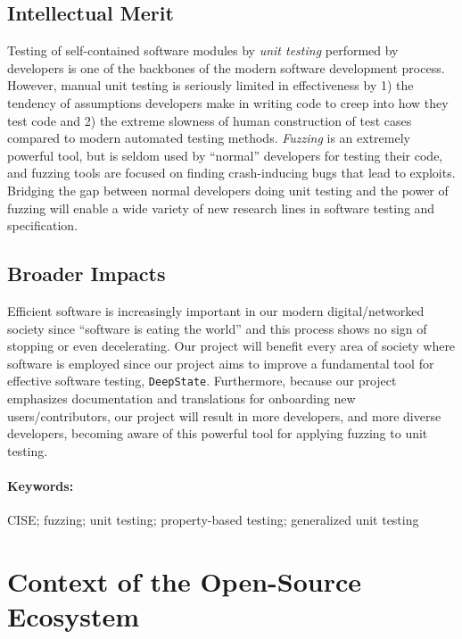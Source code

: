 \documentclass[numbers]{proposalnsf}
\newcommand{\ds}{\texttt{DeepState}}
\begin{document}
\subsection*{Intellectual Merit} 
\vspace{-2mm}
Testing of self-contained software modules by \emph{unit testing} performed by developers is one of the backbones of the modern software development process.  However, manual unit testing is seriously limited in effectiveness by 1) the tendency of assumptions developers make in writing code to creep into how they test code and 2) the extreme slowness of human construction of test cases compared to modern automated testing methods.  \emph{Fuzzing} is an extremely powerful tool, but is seldom used by ``normal'' developers for testing their code, and fuzzing tools are focused on finding crash-inducing bugs that lead to exploits.  Bridging the gap between normal developers doing unit testing and the power of fuzzing will enable a wide variety of new research lines in software testing and specification.

\subsection*{Broader Impacts}
\vspace{-2mm}

Efficient software is increasingly important in our modern digital/networked society since ``software is eating the world'' and this process shows no sign of stopping or even decelerating. 
Our project will benefit every area of society where software is employed since our project aims to improve a fundamental tool for effective software testing, \ds.
Furthermore, because our project emphasizes documentation and translations for onboarding new users/contributors, our project will result in more developers, and more diverse developers, becoming aware of this powerful tool for applying fuzzing to unit testing.

\paragraph{Keywords:}
CISE; fuzzing; unit testing; property-based testing; generalized unit testing

\newpage  
\section{Context of the Open-Source Ecosystem}%
\end{document}
